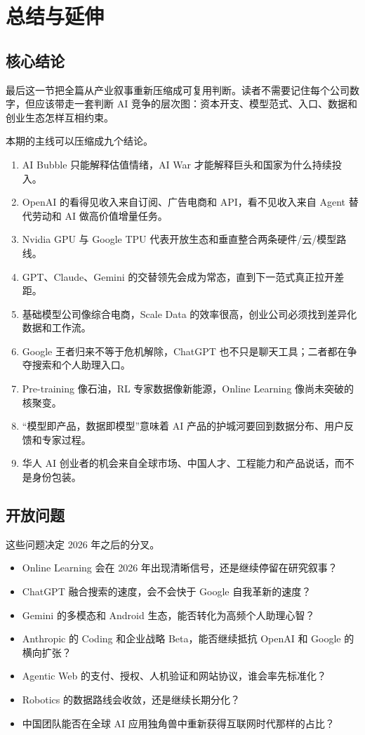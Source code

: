\section{总结与延伸}

\subsection{核心结论}

最后这一节把全篇从产业叙事重新压缩成可复用判断。读者不需要记住每个公司数字，但应该带走一套判断 AI 竞争的层次图：资本开支、模型范式、入口、数据和创业生态怎样互相约束。

本期的主线可以压缩成九个结论。

\begin{enumerate}
\item AI Bubble 只能解释估值情绪，AI War 才能解释巨头和国家为什么持续投入。
\item OpenAI 的看得见收入来自订阅、广告电商和 API，看不见收入来自 Agent 替代劳动和 AI 做高价值增量任务。
\item Nvidia GPU 与 Google TPU 代表开放生态和垂直整合两条硬件/云/模型路线。
\item GPT、Claude、Gemini 的交替领先会成为常态，直到下一范式真正拉开差距。
\item 基础模型公司像综合电商，Scale Data 的效率很高，创业公司必须找到差异化数据和工作流。
\item Google 王者归来不等于危机解除，ChatGPT 也不只是聊天工具；二者都在争夺搜索和个人助理入口。
\item Pre-training 像石油，RL 专家数据像新能源，Online Learning 像尚未突破的核聚变。
\item “模型即产品，数据即模型”意味着 AI 产品的护城河要回到数据分布、用户反馈和专家过程。
\item 华人 AI 创业者的机会来自全球市场、中国人才、工程能力和产品说话，而不是身份包装。
\end{enumerate}

\subsection{开放问题}

这些问题决定 2026 年之后的分叉。

\begin{itemize}
\item Online Learning 会在 2026 年出现清晰信号，还是继续停留在研究叙事？
\item ChatGPT 融合搜索的速度，会不会快于 Google 自我革新的速度？
\item Gemini 的多模态和 Android 生态，能否转化为高频个人助理心智？
\item Anthropic 的 Coding 和企业战略 Beta，能否继续抵抗 OpenAI 和 Google 的横向扩张？
\item Agentic Web 的支付、授权、人机验证和网站协议，谁会率先标准化？
\item Robotics 的数据路线会收敛，还是继续长期分化？
\item 中国团队能否在全球 AI 应用独角兽中重新获得互联网时代那样的占比？
\end{itemize}

